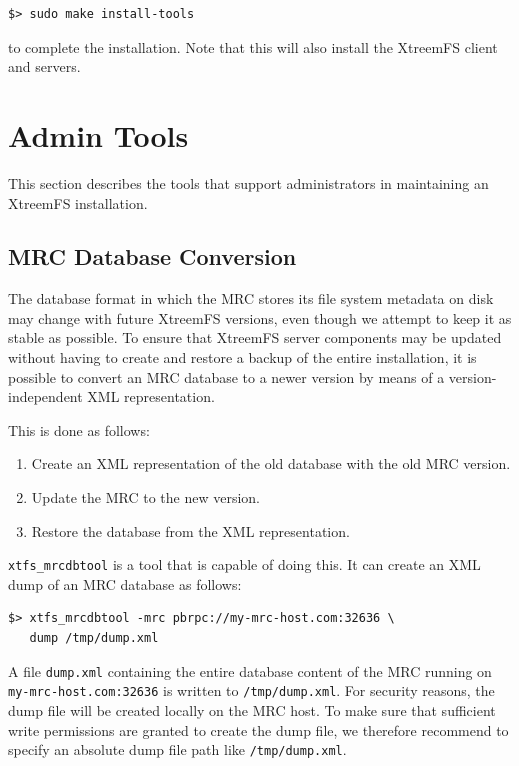 \documentclass[a4paper,10pt]{book}
\begin{document}
\begin{verbatim}
$> sudo make install-tools
\end{verbatim}

to complete the installation. Note that this will also install the XtreemFS client and servers.

\section{Admin Tools}

This section describes the tools that support administrators in maintaining an XtreemFS installation.

\subsection{MRC Database Conversion}
\label{sec:mrcdbtools}

The database format in which the MRC stores its file system metadata on disk may change with future XtreemFS versions, even though we attempt to keep it as stable as possible. To ensure that XtreemFS server components may be updated without having to create and restore a backup of the entire installation, it is possible to convert an MRC database to a newer version by means of a version-independent XML representation.

This is done as follows:
\begin{enumerate}
  \item Create an XML representation of the old database with the old MRC version.
  \item Update the MRC to the new version.
  \item Restore the database from the XML representation.
\end{enumerate}

\texttt{xtfs\_mrcdbtool} is a tool that is capable of doing this. It can create an XML dump of an MRC database as follows:

\begin{verbatim}
$> xtfs_mrcdbtool -mrc pbrpc://my-mrc-host.com:32636 \
   dump /tmp/dump.xml
\end{verbatim}

A file \texttt{dump.xml} containing the entire database content of the MRC running on \texttt{my-mrc-host.com:32636} is written to \texttt{/tmp/dump.xml}. For security reasons, the dump file will be created locally on the MRC host. To make sure that sufficient write permissions are granted to create the dump file, we therefore recommend to specify an absolute dump file path like \texttt{/tmp/dump.xml}.
\end{document}

